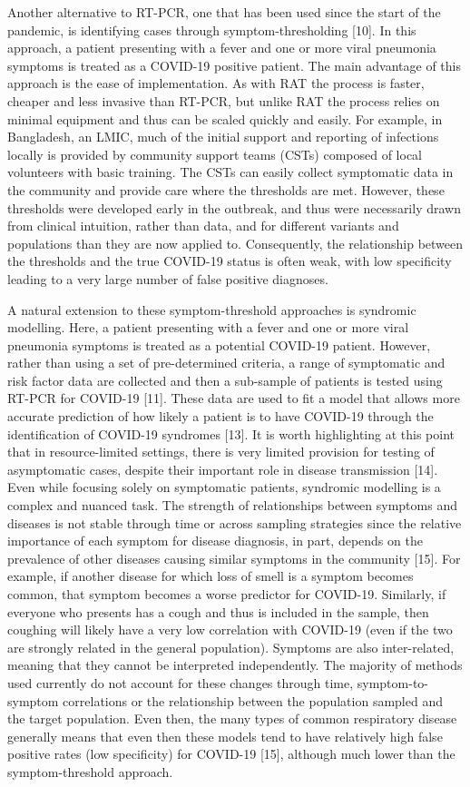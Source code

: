 \documentclass[]{elsarticle} %
\begin{document}
Another alternative to RT-PCR, one that has been used since the start of the pandemic, is identifying cases through symptom-thresholding {[}10{]}.
In this approach, a patient presenting with a fever and one or more viral pneumonia symptoms is treated as a COVID-19 positive patient.
The main advantage of this approach is the ease of implementation.
As with RAT the process is faster, cheaper and less invasive than RT-PCR, but unlike RAT the process relies on minimal equipment and thus can be scaled quickly and easily.
For example, in Bangladesh, an LMIC, much of the initial support and reporting of infections locally is provided by community support teams (CSTs) composed of local volunteers with basic training.
The CSTs can easily collect symptomatic data in the community and provide care where the thresholds are met.
However, these thresholds were developed early in the outbreak, and thus were necessarily drawn from clinical intuition, rather than data, and for different variants and populations than they are now applied to.
Consequently, the relationship between the thresholds and the true COVID-19 status is often weak, with low specificity leading to a very large number of false positive diagnoses.

A natural extension to these symptom-threshold approaches is syndromic modelling.
Here, a patient presenting with a fever and one or more viral pneumonia symptoms is treated as a potential COVID-19 patient.
However, rather than using a set of pre-determined criteria, a range of symptomatic and risk factor data are collected and then a sub-sample of patients is tested using RT-PCR for COVID-19 {[}11{]}.
These data are used to fit a model that allows more accurate prediction of how likely a patient is to have COVID-19 through the identification of COVID-19 syndromes {[}13{]}.
It is worth highlighting at this point that in resource-limited settings, there is very limited provision for testing of asymptomatic cases, despite their important role in disease transmission {[}14{]}.
Even while focusing solely on symptomatic patients, syndromic modelling is a complex and nuanced task.
The strength of relationships between symptoms and diseases is not stable through time or across sampling strategies since the relative importance of each symptom for disease diagnosis, in part, depends on the prevalence of other diseases causing similar symptoms in the community {[}15{]}.
For example, if another disease for which loss of smell is a symptom becomes common, that symptom becomes a worse predictor for COVID-19.
Similarly, if everyone who presents has a cough and thus is included in the sample, then coughing will likely have a very low correlation with COVID-19 (even if the two are strongly related in the general population).
Symptoms are also inter-related, meaning that they cannot be interpreted independently.
The majority of methods used currently do not account for these changes through time, symptom-to-symptom correlations or the relationship between the population sampled and the target population.
Even then, the many types of common respiratory disease generally means that even then these models tend to have relatively high false positive rates (low specificity) for COVID-19 {[}15{]}, although much lower than the symptom-threshold approach.
\end{document}
